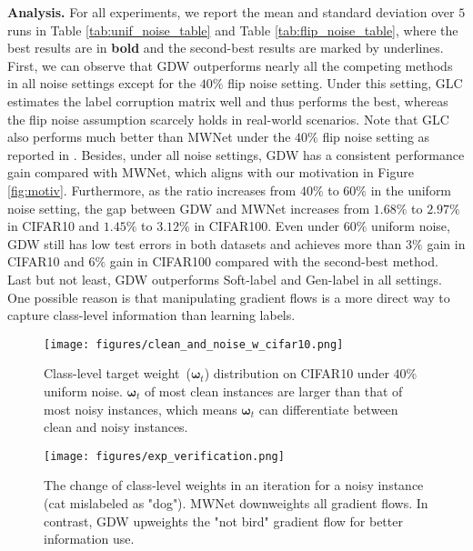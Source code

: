 \noindent \textbf{Analysis.} For all experiments, we report the mean and standard deviation over $5$ runs in Table \ref{tab:unif_noise_table} and Table \ref{tab:flip_noise_table}, where 
the best results are in \textbf{bold} and the second-best results are marked by underlines.
%
First, we can observe that GDW outperforms nearly all the competing methods in all noise settings except for the $40\%$ flip noise setting.
%
Under this setting, GLC estimates the label corruption matrix well and thus performs the best, whereas the flip noise assumption scarcely holds in real-world scenarios.
%
Note that GLC also performs much better than MWNet under the $40\%$ flip noise setting as reported in \cite{shuMetaWeightNetLearningExplicit2019a}.
%
Besides, under all noise settings, GDW has a consistent performance gain compared with MWNet, which aligns with our motivation in Figure \ref{fig:motiv}.
%
Furthermore, as the ratio increases from $40\%$ to $60\%$ in the uniform noise setting, the gap between GDW and MWNet increases from $1.68\%$ to $2.97\%$ in CIFAR10 and $1.45\%$ to $3.12\%$ in CIFAR100.
%
Even under $60\%$ uniform noise, GDW still has low test errors in both datasets and achieves more than $3\%$ gain in CIFAR10 and $6\%$ gain in CIFAR100 compared with the second-best method.
%
Last but not least, GDW outperforms Soft-label and Gen-label in all settings.
%
One possible reason is that manipulating gradient flows is a more direct way to capture class-level information than learning labels.

\begin{figure}
\centering
\begin{minipage}[t]{.5\textwidth}
  \centering
    \captionsetup{width=.95\linewidth}
    \texttt{[image: figures/clean\_and\_noise\_w\_cifar10.png]} 
    \caption{Class-level target weight~($\boldsymbol{\omega}_t$) distribution on CIFAR10 under $40\%$ uniform noise.
    $\boldsymbol{\omega}_t$ of most clean instances are larger than that of most noisy instances, which means $\boldsymbol{\omega}_t$
    can differentiate between clean and noisy instances.
    }
    \label{fig:clean_and_noise_w_cifar10}
\end{minipage}%
\begin{minipage}[t]{.5\textwidth}
  \centering
    \captionsetup{width=.95\linewidth}
    \texttt{[image: figures/exp\_verification.png]} 
    \caption{The change of class-level weights in an iteration for a noisy instance (cat mislabeled as "dog").  MWNet downweights all gradient flows. In contrast, GDW upweights the "not bird" gradient flow for better information use.}
    \label{fig:exp_verification}
\end{minipage}
\end{figure}

